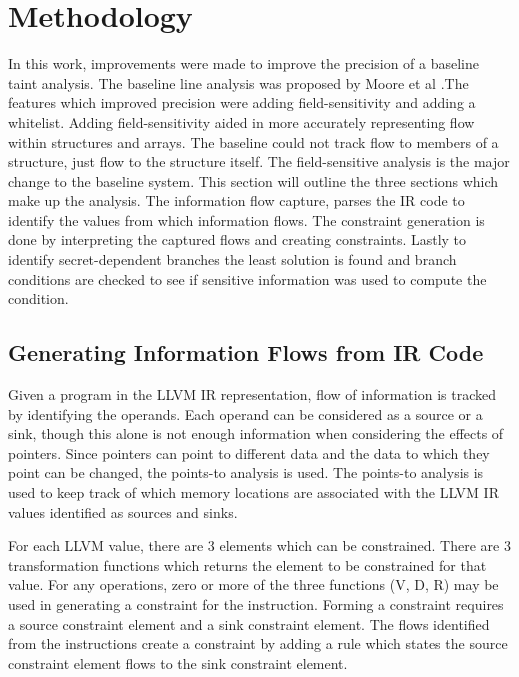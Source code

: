 \section{Methodology}
In this work, improvements were made to improve the precision of a baseline
taint analysis. The baseline line analysis was proposed by Moore et al
\cite{moore2011static}.The features which improved precision were adding
field-sensitivity and adding a whitelist. Adding field-sensitivity aided in more
accurately representing flow within structures and arrays. The baseline could
not track flow to members of a structure, just flow to the structure itself. The
field-sensitive analysis is the major change to the baseline system. This
section will outline the three sections which make up the analysis. The
information flow capture, parses the IR code to identify the values from which
information flows. The constraint generation is done by interpreting the
captured flows and creating constraints. Lastly to identify secret-dependent
branches the least solution is found and branch conditions are checked to see if
sensitive information was used to compute the condition.

\subsection{Generating Information Flows from IR Code}

   Given a program in the LLVM IR representation, flow of information is tracked
   by identifying the operands. Each operand can be considered as a source or a
   sink, though this alone is not enough information when considering the
   effects of pointers. Since pointers can point to different data and the data
   to which they point can be changed, the points-to analysis is used. The
   points-to analysis is used to keep track of which memory locations are
   associated with the LLVM IR values identified as sources and sinks.

   For each LLVM value, there are 3 elements which can be constrained. There are
   3 transformation functions which returns the element to be constrained for
   that value. For any operations, zero or more of the three functions (V, D, R)
   may be used in generating a constraint for the instruction. Forming a
   constraint requires a source constraint element and a sink constraint
   element. The flows identified from the instructions create a constraint by
   adding a rule which states the source constraint element flows to the sink
   constraint element.

